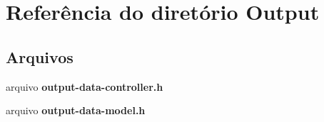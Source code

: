 \section{Referência do diretório Output}
\label{dir_fcd0f5c9ec1d25889549b713a84398c7}
\subsection*{Arquivos}
\begin{DoxyCompactItemize}
\item 
arquivo {\bf output-\/data-\/controller.\+h}
\item 
arquivo {\bf output-\/data-\/model.\+h}
\end{DoxyCompactItemize}
